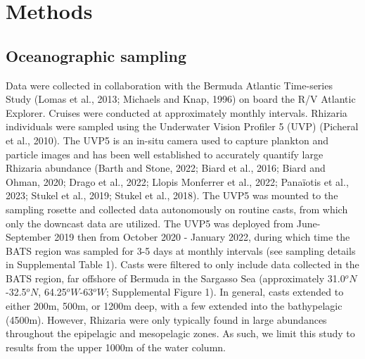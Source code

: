\documentclass[
]{article}
\begin{document}
\section{Methods}\label{methods}

\subsection{Oceanographic sampling}\label{oceanographic-sampling}

Data were collected in collaboration with the Bermuda Atlantic
Time-series Study (Lomas et al., 2013; Michaels and Knap, 1996) on board
the R/V Atlantic Explorer. Cruises were conducted at approximately
monthly intervals. Rhizaria individuals were sampled using the
Underwater Vision Profiler 5 (UVP) (Picheral et al., 2010). The UVP5 is
an in-situ camera used to capture plankton and particle images and has
been well established to accurately quantify large Rhizaria abundance
(Barth and Stone, 2022; Biard et al., 2016; Biard and Ohman, 2020; Drago
et al., 2022; Llopis Monferrer et al., 2022; Panaïotis et al., 2023;
Stukel et al., 2019; Stukel et al., 2018). The UVP5 was mounted to the
sampling rosette and collected data autonomously on routine casts, from
which only the downcast data are utilized. The UVP5 was deployed from
June-September 2019 then from October 2020 - January 2022, during which
time the BATS region was sampled for 3-5 days at monthly intervals (see
sampling details in Supplemental Table 1). Casts were filtered to only
include data collected in the BATS region, far offshore of Bermuda in
the Sargasso Sea (approximately 31.0\(^oN\)-32.5\(^oN\),
64.25\(^oW\)-63\(^oW\); Supplemental Figure 1). In general, casts
extended to either 200m, 500m, or 1200m deep, with a few extended into
the bathypelagic (4500m). However, Rhizaria were only typically found in
large abundances throughout the epipelagic and mesopelagic zones. As
such, we limit this study to results from the upper 1000m of the water
column.
\end{document}
